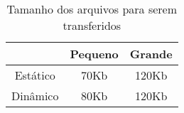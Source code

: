 \begin{table}[!h]
  \centering
  \begin{tabular}{|c|c|c|}
      \hline 
    & \textbf{Pequeno} & \textbf{Grande}\\
      \hline\hline
    Estático & 70Kb & 120Kb\\
      \hline
    Dinâmico & 80Kb & 120Kb \\
      \hline
  \end{tabular}

  \caption{Tamanho dos arquivos para serem transferidos}
  \label{tab:file_size}
\end{table}

